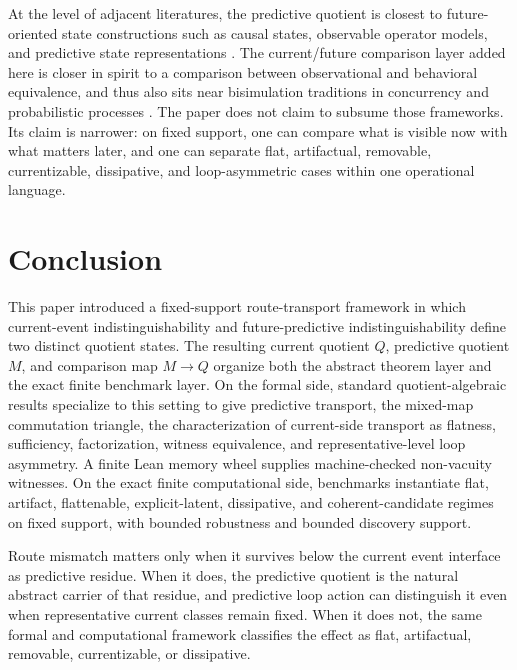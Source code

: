 \documentclass[11pt]{article}
\newcommand{\CurrentQ}{Q}
\newcommand{\PredictiveQ}{M}
\theoremstyle{definition}
\begin{document}
At the level of adjacent literatures, the predictive quotient is closest to future-oriented state constructions such as causal states, observable operator models, and predictive state representations \citep{ShaliziCrutchfield2001ComputationalMechanics,Jaeger2000ObservableOperatorModels,LittmanSuttonSingh2002PredictiveRepresentationsState}. The current/future comparison layer added here is closer in spirit to a comparison between observational and behavioral equivalence, and thus also sits near bisimulation traditions in concurrency and probabilistic processes \citep{Park1981ConcurrencyAutomata,Milner1989CommunicationConcurrency,LarsenSkou1991BisimulationThroughProbabilisticTesting}. The paper does not claim to subsume those frameworks. Its claim is narrower: on fixed support, one can compare what is visible now with what matters later, and one can separate flat, artifactual, removable, currentizable, dissipative, and loop-asymmetric cases within one operational language.

\section{Conclusion}\label{sec:conclusion}
This paper introduced a fixed-support route-transport framework in which current-event indistinguishability and future-predictive indistinguishability define two distinct quotient states. The resulting current quotient $\CurrentQ$, predictive quotient $\PredictiveQ$, and comparison map $\PredictiveQ \to \CurrentQ$ organize both the abstract theorem layer and the exact finite benchmark layer. On the formal side, standard quotient-algebraic results specialize to this setting to give predictive transport, the mixed-map commutation triangle, the characterization of current-side transport as flatness, sufficiency, factorization, witness equivalence, and representative-level loop asymmetry. A finite Lean memory wheel supplies machine-checked non-vacuity witnesses. On the exact finite computational side, benchmarks instantiate flat, artifact, flattenable, explicit-latent, dissipative, and coherent-candidate regimes on fixed support, with bounded robustness and bounded discovery support.

Route mismatch matters only when it survives below the current event interface as predictive residue. When it does, the predictive quotient is the natural abstract carrier of that residue, and predictive loop action can distinguish it even when representative current classes remain fixed. When it does not, the same formal and computational framework classifies the effect as flat, artifactual, removable, currentizable, or dissipative.
\end{document}
